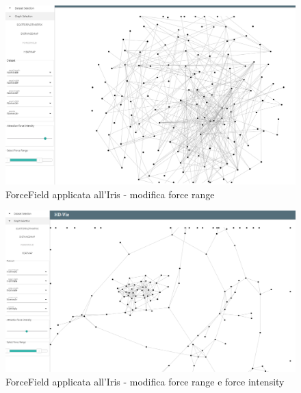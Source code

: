 \documentclass[../manuale_utente.tex]{subfiles}
\begin{document}
\begin{figure}[H]
	\centering
	\includegraphics[width=18cm]{img/ff/ff_iris_3}
	\caption{ForceField applicata all'Iris - modifica force range}
\end{figure}

\begin{figure}[H]
	\centering
	\includegraphics[width=18cm]{img/ff/ff_iris_4}
	\caption{ForceField applicata all'Iris - modifica force range e force intensity}
\end{figure}
\end{document}

